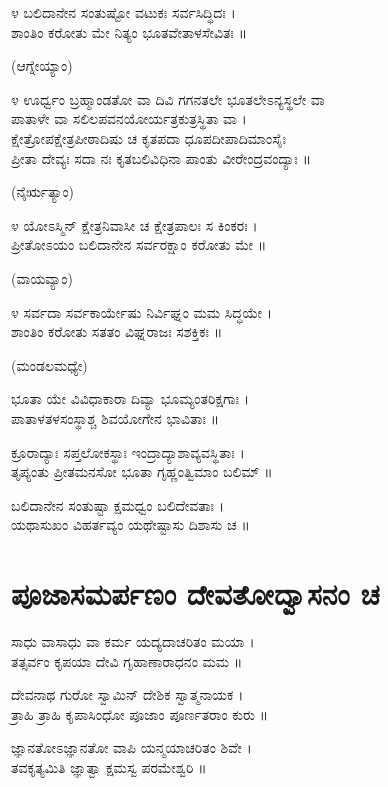 ೪ ಬಲಿದಾನೇನ ಸಂತುಷ್ಟೋ ವಟುಕಃ ಸರ್ವಸಿದ್ಧಿದಃ ।\\
ಶಾಂತಿಂ ಕರೋತು ಮೇ ನಿತ್ಯಂ ಭೂತವೇತಾಳಸೇವಿತಃ ॥

(ಆಗ್ನೇಯ್ಯಾಂ)\\

೪ ಊರ್ಧ್ವಂ ಬ್ರಹ್ಮಾಂಡತೋ ವಾ ದಿವಿ ಗಗನತಲೇ ಭೂತಲೇಽನ್ಯಸ್ಥಲೇ ವಾ\\
ಪಾತಾಳೇ ವಾ ಸಲಿಲಪವನಯೋರ್ಯತ್ರಕುತ್ರಸ್ಥಿತಾ ವಾ ।\\
ಕ್ಷೇತ್ರೋಪಕ್ಷೇತ್ರಪೀಠಾದಿಷು ಚ ಕೃತಪದಾ ಧೂಪದೀಪಾದಿಮಾಂಸೈಃ\\
ಪ್ರೀತಾ ದೇವ್ಯಃ ಸದಾ ನಃ ಕೃತಬಲಿವಿಧಿನಾ ಪಾಂತು ವೀರೇಂದ್ರವಂದ್ಯಾಃ ॥

(ನೈರ್ಋತ್ಯಾಂ)\\

೪ ಯೋಽಸ್ಮಿನ್ ಕ್ಷೇತ್ರನಿವಾಸೀ ಚ ಕ್ಷೇತ್ರಪಾಲಃ ಸ ಕಿಂಕರಃ ।\\
ಪ್ರೀತೋಽಯಂ ಬಲಿದಾನೇನ ಸರ್ವರಕ್ಷಾಂ ಕರೋತು ಮೇ ॥

(ವಾಯವ್ಯಾಂ)\\

೪ ಸರ್ವದಾ ಸರ್ವಕಾರ್ಯೇಷು ನಿರ್ವಿಘ್ನಂ ಮಮ ಸಿದ್ಧಯೇ ।\\
ಶಾಂತಿಂ ಕರೋತು ಸತತಂ ವಿಘ್ನರಾಜಃ ಸಶಕ್ತಿಕಃ ॥

(ಮಂಡಲಮಧ್ಯೇ)\\

ಭೂತಾ ಯೇ ವಿವಿಧಾಕಾರಾ ದಿವ್ಯಾ ಭೂಮ್ಯಂತರಿಕ್ಷಗಾಃ ।\\
ಪಾತಾಳತಳಸಂಸ್ಥಾಶ್ಚ ಶಿವಯೋಗೇನ ಭಾವಿತಾಃ ॥

ಕ್ರೂರಾದ್ಯಾಃ ಸಪ್ತಲೋಕಸ್ಥಾಃ ಇಂದ್ರಾದ್ಯಾಶಾವ್ಯವಸ್ಥಿತಾಃ ।\\
ತೃಪ್ಯಂತು ಪ್ರೀತಮನಸೋ ಭೂತಾ ಗೃಹ್ಣಂತ್ವಿಮಾಂ ಬಲಿಮ್ ॥

ಬಲಿದಾನೇನ ಸಂತುಷ್ಟಾ  ಕ್ಷಮಧ್ವಂ ಬಲಿದೇವತಾಃ ।\\
ಯಥಾಸುಖಂ ವಿಹರ್ತವ್ಯಂ ಯಥೇಷ್ಟಾಸು ದಿಶಾಸು ಚ ॥
\newpage
\section{ಪೂಜಾಸಮರ್ಪಣಂ ದೇವತೋದ್ವಾಸನಂ ಚ}
ಸಾಧು ವಾಸಾಧು ವಾ ಕರ್ಮ ಯದ್ಯದಾಚರಿತಂ ಮಯಾ ।\\ ತತ್ಸರ್ವಂ ಕೃಪಯಾ ದೇವಿ ಗೃಹಾಣಾರಾಧನಂ ಮಮ ॥

ದೇವನಾಥ ಗುರೋ ಸ್ವಾಮಿನ್ ದೇಶಿಕ ಸ್ವಾತ್ಮನಾಯಕ ।\\ ತ್ರಾಹಿ ತ್ರಾಹಿ ಕೃಪಾಸಿಂಧೋ ಪೂಜಾಂ ಪೂರ್ಣತರಾಂ ಕುರು ॥

ಜ್ಞಾನತೋಽಜ್ಞಾನತೋ ವಾಪಿ ಯನ್ಮಯಾಚರಿತಂ ಶಿವೇ ।\\ ತವಕೃತ್ಯಮಿತಿ ಜ್ಞಾತ್ವಾ ಕ್ಷಮಸ್ವ ಪರಮೇಶ್ವರಿ ॥

